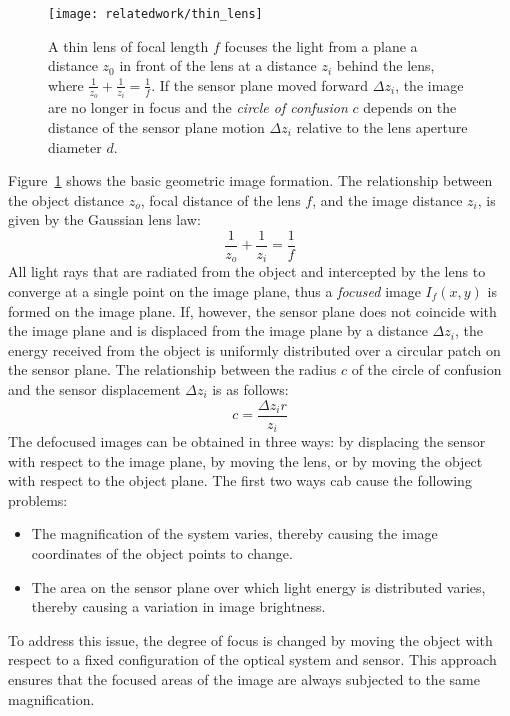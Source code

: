 \begin{figure}[h]
\centering
\texttt{[image: relatedwork/thin\_lens]}
\caption{A thin lens of focal length $f$ focuses the light from a plane a distance $z_0$ in front of the lens at a distance $z_i$ behind the lens, where $\frac{1}{z_o}+\frac{1}{z_i}=\frac{1}{f}$. If the sensor plane moved forward $\Delta z_i$, the image are no longer in focus and the \textit{circle of confusion} $c$ depends on the distance of the sensor plane motion $\Delta z_i$ relative to the lens aperture diameter $d$.}
\label{fig:thin_lens}
\end{figure}

Figure~\ref{fig:thin_lens} shows the basic geometric image formation. The relationship between the object distance $z_o$, focal distance of the lens $f$, and the image distance $z_i$, is given by the Gaussian lens law:
$$
\frac{1}{z_o}+\frac{1}{z_i}=\frac{1}{f}
$$
All light rays that are radiated from the object and intercepted by the lens to converge at a single point on the image plane, thus a \textit{focused} image $I_f(x, y)$ is formed on the image plane. If, however, the sensor plane does not coincide with the image plane and is displaced from the image plane by a distance $\Delta z_i$, the energy received from the object is uniformly distributed over a circular patch on the sensor plane. The relationship between the radius $c$ of the circle of confusion and the sensor displacement $\Delta z_i$ is as follows:
$$
c = \frac{\Delta z_i r}{z_i}
$$
The defocused images can be obtained in three ways: by displacing the sensor with respect to the image plane, by moving the lens, or by moving the object with respect to the object plane. The first two ways cab cause the following problems:
\begin{itemize}
\item The magnification of the system varies, thereby causing the image coordinates of the object points to change.
\item The area on the sensor plane over which light energy is distributed varies, thereby causing a variation in image brightness.
\end{itemize}
To address this issue, the degree of focus is changed by moving the object with respect to a fixed configuration of the optical system and sensor. This approach ensures that the focused areas of the image are always subjected to the same magnification.


